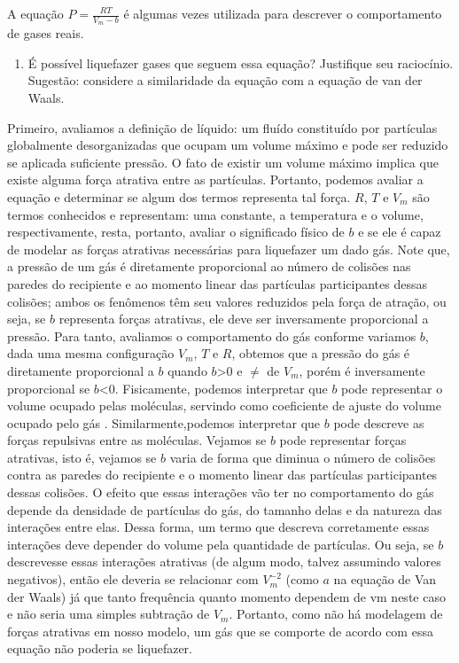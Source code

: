 \begin{xcs}
    A equação \( P = \frac{RT}{V_m - b} \) é algumas vezes utilizada para
    descrever o comportamento de gases reais. 
    \begin{enumerate}[label=\alph*.]
        \item É possível liquefazer gases que seguem essa equação? Justifique
            seu raciocínio. Sugestão: considere a similaridade da equação com a
            equação de van der Waals. 
    \end{enumerate}
\end{xcs}
\begin{rsl}
    Primeiro, avaliamos a definição de líquido: um fluído constituído por
    partículas globalmente desorganizadas que ocupam um volume máximo e pode
    ser reduzido se aplicada suficiente pressão. O fato de existir um volume
    máximo implica que existe alguma força atrativa entre as partículas.
    Portanto, podemos avaliar a equação e determinar se algum dos termos
    representa tal força. $R$, $T$ e $V_m$ são termos conhecidos e 
    representam: uma constante, a temperatura e o volume, respectivamente, resta, portanto,
    avaliar o significado físico de $b$ e se ele é capaz de modelar as forças atrativas necessárias para liquefazer um dado gás. Note que, a pressão de um gás é diretamente proporcional ao número de colisões nas paredes do recipiente e ao momento linear das partículas participantes dessas colisões; ambos os fenômenos têm seu valores reduzidos pela força de atração, ou seja, se $b$ representa forças atrativas, ele deve ser inversamente proporcional a pressão. Para tanto, avaliamos o comportamento do gás conforme variamos $b$, dada uma mesma configuração $V_m$, $T$ e
    $R$, obtemos que a pressão do gás é diretamente proporcional a $b$ quando $b$>0 e $\neq$ de $V_m$, porém é inversamente proporcional se $b$<0. Fisicamente, podemos interpretar que $b$ pode representar o volume ocupado pelas moléculas, servindo como coeficiente de ajuste do volume ocupado pelo gás . Similarmente,podemos interpretar que $b$ pode descreve as forças repulsivas entre as moléculas.
    Vejamos se \( b \) pode representar forças atrativas, isto é, vejamos se \(
    b\) varia de forma que diminua o número de colisões contra as paredes do
    recipiente e o momento linear das partículas participantes dessas colisões.
     O efeito que essas interações vão
    ter no comportamento do gás depende da densidade de partículas do gás, do tamanho
    delas e da natureza das interações entre elas. Dessa forma, um termo
    que descreva corretamente essas interações deve depender do volume pela
    quantidade de partículas. Ou seja, se \( b \) descrevesse essas interações
    atrativas (de algum modo, talvez assumindo valores negativos),
    então ele deveria se relacionar com \(
    V_m^{-2}\) (como \( a \) na equação de Van der Waals) já que tanto frequência quanto momento dependem de vm neste caso e não seria uma
    simples subtração de \( V_m \).
    Portanto, como não há modelagem de forças atrativas em nosso modelo, um gás 
    que se comporte de acordo com essa equação não poderia se liquefazer.
\end{rsl}
